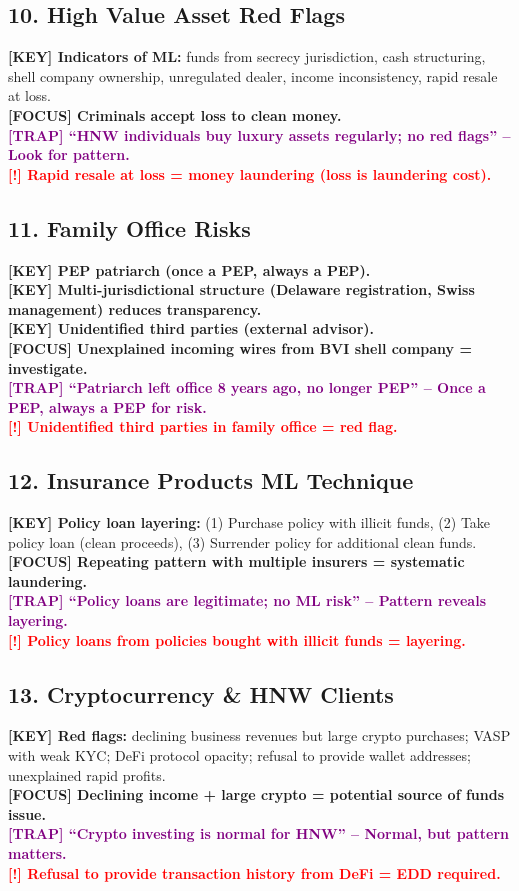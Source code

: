 \documentclass[10pt,a4paper]{article}
\newcommand{\redflag}[1]{\textcolor{red}{\textbf{[!] #1}}}
\newcommand{\examfocus}[1]{\textcolor{orange!80!black}{\textbf{[FOCUS] #1}}}
\newcommand{\trap}[1]{\textcolor{purple}{\textbf{[TRAP] #1}}}
\newcommand{\keyterm}[1]{\textcolor{red!80!black}{\textbf{[KEY] #1}}}
\begin{document}
\subsection*{10. High Value Asset Red Flags}
\keyterm{Indicators of ML:} funds from secrecy jurisdiction, cash structuring, shell company ownership, unregulated dealer, income inconsistency, rapid resale at loss. \\
\examfocus{Criminals accept loss to clean money.} \\
\trap{“HNW individuals buy luxury assets regularly; no red flags” – Look for pattern.} \\
\redflag{Rapid resale at loss = money laundering (loss is laundering cost).}

\subsection*{11. Family Office Risks}
\keyterm{PEP patriarch (once a PEP, always a PEP).} \\
\keyterm{Multi-jurisdictional structure (Delaware registration, Swiss management) reduces transparency.} \\
\keyterm{Unidentified third parties (external advisor).} \\
\examfocus{Unexplained incoming wires from BVI shell company = investigate.} \\
\trap{“Patriarch left office 8 years ago, no longer PEP” – Once a PEP, always a PEP for risk.} \\
\redflag{Unidentified third parties in family office = red flag.}

\subsection*{12. Insurance Products ML Technique}
\keyterm{Policy loan layering:} (1) Purchase policy with illicit funds, (2) Take policy loan (clean proceeds), (3) Surrender policy for additional clean funds. \\
\examfocus{Repeating pattern with multiple insurers = systematic laundering.} \\
\trap{“Policy loans are legitimate; no ML risk” – Pattern reveals layering.} \\
\redflag{Policy loans from policies bought with illicit funds = layering.}

\subsection*{13. Cryptocurrency \& HNW Clients}
\keyterm{Red flags:} declining business revenues but large crypto purchases; VASP with weak KYC; DeFi protocol opacity; refusal to provide wallet addresses; unexplained rapid profits. \\
\examfocus{Declining income + large crypto = potential source of funds issue.} \\
\trap{“Crypto investing is normal for HNW” – Normal, but pattern matters.} \\
\redflag{Refusal to provide transaction history from DeFi = EDD required.}
\end{document}
